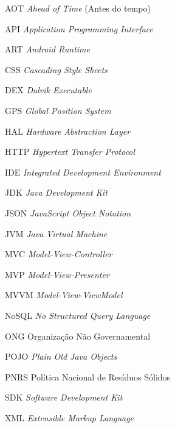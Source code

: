 \documentclass[
	12pt,				%
	openany,			%
	twoside,			%
	a4paper,			%
	english,			%
	french,				%
	spanish,			%
	brazil				%
	]{abntex2}
\begin{document}
\begin{siglas}

   \item[AOT] \textit{Ahead of Time} (Antes do tempo)
   \item[API] \textit{Application Programming Interface}   
   \item[ART] \textit{Android Runtime}
   \item[CSS] \textit{Cascading Style Sheets}
   \item[DEX] \textit{Dalvik Executable}
   \item[GPS] \textit{Global Position System}
   \item[HAL] \textit{Hardware Abstraction Layer}
   \item[HTTP] \textit{Hypertext Transfer Protocol}
   \item[IDE] \textit{Integrated Development Environment}   
   \item[JDK] \textit{Java Development Kit}
   \item[JSON] \textit{JavaScript Object Notation}
   \item[JVM] \textit{Java Virtual Machine}
   \item[MVC] \textit{Model-View-Controller}
   \item[MVP] \textit{Model-View-Presenter}
   \item[MVVM] \textit{Model-View-ViewModel}   
   \item[NoSQL] \textit{No Structured Query Language}
   \item[ONG]  {Organização Não Governamental}
   \item[POJO] \textit{Plain Old Java Objects}
   \item[PNRS] {Política Nacional de Resíduos Sólidos}
   \item[SDK] \textit{Software Development Kit}
   \item[XML] \textit{Extensible Markup Language}
   
  
\end{siglas}



\end{document}
